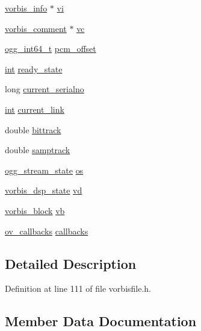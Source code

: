 \begin{DoxyCompactItemize}
\item 
\hyperlink{structvorbis__info}{vorbis\+\_\+info} $\ast$ \hyperlink{struct_ogg_vorbis___file_aa5586b939d7c31c8eec83cf1380b45a6}{vi}
\item 
\hyperlink{structvorbis__comment}{vorbis\+\_\+comment} $\ast$ \hyperlink{struct_ogg_vorbis___file_a4467850c72aed93fe0a70e8f1fd6f20e}{vc}
\item 
\hyperlink{config__types_8h_a292432ede703993aa88db876e11b2306}{ogg\+\_\+int64\+\_\+t} \hyperlink{struct_ogg_vorbis___file_a23d5ba7ca52640ceb6f633a46304cdc5}{pcm\+\_\+offset}
\item 
\hyperlink{xmltok_8h_a5a0d4a5641ce434f1d23533f2b2e6653}{int} \hyperlink{struct_ogg_vorbis___file_ad304fe18bebc075c34f2e5ec7d1f2a99}{ready\+\_\+state}
\item 
long \hyperlink{struct_ogg_vorbis___file_ad7545f86b92a6d66641f3d04a2497763}{current\+\_\+serialno}
\item 
\hyperlink{xmltok_8h_a5a0d4a5641ce434f1d23533f2b2e6653}{int} \hyperlink{struct_ogg_vorbis___file_a9b2d64c3739364ac4c08070aac2e0588}{current\+\_\+link}
\item 
double \hyperlink{struct_ogg_vorbis___file_aa72a11d9f154636d4dc9edac4c9eb843}{bittrack}
\item 
double \hyperlink{struct_ogg_vorbis___file_a3fcbfeaad027ada99496dfcaf94866a9}{samptrack}
\item 
\hyperlink{structogg__stream__state}{ogg\+\_\+stream\+\_\+state} \hyperlink{struct_ogg_vorbis___file_a8658f17a6f662a74f8763c47d560d712}{os}
\item 
\hyperlink{structvorbis__dsp__state}{vorbis\+\_\+dsp\+\_\+state} \hyperlink{struct_ogg_vorbis___file_acb9d38719f54642d1a39f24203b466d6}{vd}
\item 
\hyperlink{structvorbis__block}{vorbis\+\_\+block} \hyperlink{struct_ogg_vorbis___file_a3201599977a781b7bf559167cd892638}{vb}
\item 
\hyperlink{structov__callbacks}{ov\+\_\+callbacks} \hyperlink{struct_ogg_vorbis___file_afb1474e24193f577dd21395a76199415}{callbacks}
\end{DoxyCompactItemize}


\subsection{Detailed Description}


Definition at line 111 of file vorbisfile.\+h.



\subsection{Member Data Documentation}
